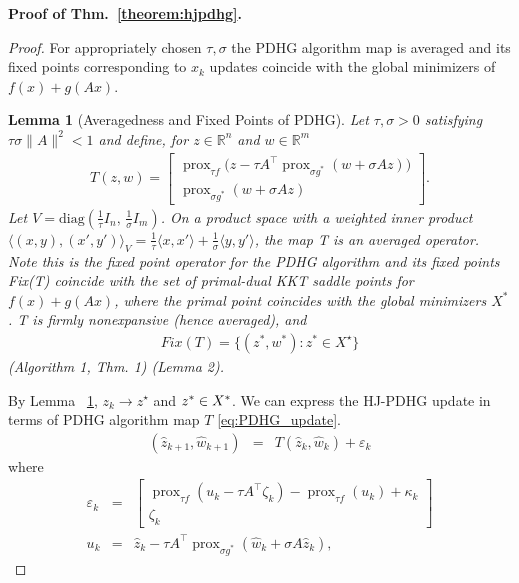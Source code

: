 \documentclass{article}
\newcommand{\Real}{\mathbb{R}}
\newcommand{\prox}{\operatorname{prox}}
\theoremstyle{plain}
\newtheorem{lemma}[theorem]{Lemma}
\theoremstyle{definition}
\theoremstyle{remark}
\begin{document}
\noindent \textbf{Proof of Thm.~\ref{theorem:hjpdhg}.}
\textit{}
\begin{proof}
For appropriately chosen $\tau,\sigma$ the PDHG algorithm map is averaged and its fixed points corresponding to $x_k$ updates coincide with the global minimizers of $f(x)+g(Ax)$.
\begin{lemma}[Averagedness and Fixed Points of PDHG]\label{lem: PDHG-fixed-point}
Let $\tau,\sigma > 0$ satisfying $\tau \sigma \|A\|^2 < 1$ and define, for $z \in \Real^n$ and $w \in \Real^m$ 
\begin{eqnarray}
\label{eq:PDHG_update}
    T(z,w) = \begin{bmatrix}
\prox_{\tau f}\!\big(z - \tau A^\top \prox_{\sigma g^*}(w + \sigma Az)\big) \\
\prox_{\sigma g^*}(w + \sigma Az)
\end{bmatrix}.
\end{eqnarray}
Let $V = \mathrm{diag}(\tfrac{1}{\tau}I_n,\, \tfrac{1}{\sigma}I_m)$. On a product space with a weighted inner product
$\langle (x,y),(x',y')\rangle_V = \tfrac{1}{\tau}\langle x,x'\rangle + \tfrac{1}{\sigma}\langle y,y'\rangle$,
the map T is an averaged operator. 
Note this is the fixed point operator for the PDHG algorithm and its fixed points Fix(T) coincide with the set of primal-dual KKT saddle points for $f(x)+g(Ax)$, where the primal point coincides with the global minimizers $X^*$. T is firmly nonexpansive (hence averaged), and 
\begin{eqnarray}
    Fix(T) = \{(z^*,w^*) : z^* \in X^\star\}
\end{eqnarray}\cite{ChambollePock2011}(Algorithm 1, Thm. 1) \cite{Fercoq2022}(Lemma 2).
\end{lemma}
By Lemma ~\ref{lem: PDHG-fixed-point}, $z_k \rightarrow z^\star$ and $z^* \in \mathnormal{X}^*$. We can express the HJ-PDHG update in terms of PDHG algorithm map $T$ \eqref{eq:PDHG_update}.
\begin{eqnarray}
    (\hat{z}_{k+1},\hat{w}_{k+1}) &=& T(\hat{z}_{k},\hat{w}_{k}) + \varepsilon_k
\end{eqnarray}
where 
\begin{eqnarray}
    \varepsilon_k &=& \begin{bmatrix}
\prox_{\tau f}(u_k - \tau A^\top \zeta_k) - \prox_{\tau f}(u_k)+\kappa_k \\
\zeta_k
\end{bmatrix}\\
u_k &=& \hat{z}_k - \tau A^\top \prox_{\sigma g^*}(\hat{w}_k+ \sigma A\hat{z}_k),

\end{eqnarray}
\end{proof}
\end{document}
